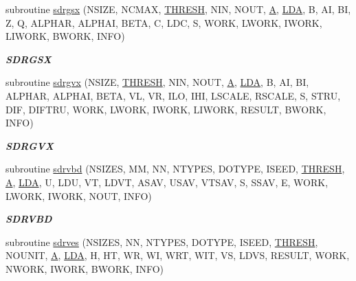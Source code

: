 \begin{DoxyCompactItemize}
subroutine \hyperlink{group__single__eig_gae0b0f905c9537cea1599d61c17e003bc}{sdrgsx} (N\+S\+I\+Z\+E, N\+C\+M\+A\+X, \hyperlink{zlaqgs_8c_a0656018abfc9fa2821827415f5d5ea57}{T\+H\+R\+E\+S\+H}, N\+I\+N, N\+O\+U\+T, \hyperlink{classA}{A}, \hyperlink{example__user_8c_ae946da542ce0db94dced19b2ecefd1aa}{L\+D\+A}, B, A\+I, B\+I, Z, Q, A\+L\+P\+H\+A\+R, A\+L\+P\+H\+A\+I, B\+E\+T\+A, C, L\+D\+C, S, W\+O\+R\+K, L\+W\+O\+R\+K, I\+W\+O\+R\+K, L\+I\+W\+O\+R\+K, B\+W\+O\+R\+K, I\+N\+F\+O)
\begin{DoxyCompactList}\small\item\em {\bfseries S\+D\+R\+G\+S\+X} \end{DoxyCompactList}\item 
subroutine \hyperlink{group__single__eig_ga01b4d3586799e995efa59513c1bc9ec2}{sdrgvx} (N\+S\+I\+Z\+E, \hyperlink{zlaqgs_8c_a0656018abfc9fa2821827415f5d5ea57}{T\+H\+R\+E\+S\+H}, N\+I\+N, N\+O\+U\+T, \hyperlink{classA}{A}, \hyperlink{example__user_8c_ae946da542ce0db94dced19b2ecefd1aa}{L\+D\+A}, B, A\+I, B\+I, A\+L\+P\+H\+A\+R, A\+L\+P\+H\+A\+I, B\+E\+T\+A, V\+L, V\+R, I\+L\+O, I\+H\+I, L\+S\+C\+A\+L\+E, R\+S\+C\+A\+L\+E, S, S\+T\+R\+U, D\+I\+F, D\+I\+F\+T\+R\+U, W\+O\+R\+K, L\+W\+O\+R\+K, I\+W\+O\+R\+K, L\+I\+W\+O\+R\+K, R\+E\+S\+U\+L\+T, B\+W\+O\+R\+K, I\+N\+F\+O)
\begin{DoxyCompactList}\small\item\em {\bfseries S\+D\+R\+G\+V\+X} \end{DoxyCompactList}\item 
subroutine \hyperlink{group__single__eig_ga7a1566f98bf91396ed2fd1e2c70865eb}{sdrvbd} (N\+S\+I\+Z\+E\+S, M\+M, N\+N, N\+T\+Y\+P\+E\+S, D\+O\+T\+Y\+P\+E, I\+S\+E\+E\+D, \hyperlink{zlaqgs_8c_a0656018abfc9fa2821827415f5d5ea57}{T\+H\+R\+E\+S\+H}, \hyperlink{classA}{A}, \hyperlink{example__user_8c_ae946da542ce0db94dced19b2ecefd1aa}{L\+D\+A}, U, L\+D\+U, V\+T, L\+D\+V\+T, A\+S\+A\+V, U\+S\+A\+V, V\+T\+S\+A\+V, S, S\+S\+A\+V, E, W\+O\+R\+K, L\+W\+O\+R\+K, I\+W\+O\+R\+K, N\+O\+U\+T, I\+N\+F\+O)
\begin{DoxyCompactList}\small\item\em {\bfseries S\+D\+R\+V\+B\+D} \end{DoxyCompactList}\item 
subroutine \hyperlink{group__single__eig_ga1f741a939ab68209bb2d6028538da0c1}{sdrves} (N\+S\+I\+Z\+E\+S, N\+N, N\+T\+Y\+P\+E\+S, D\+O\+T\+Y\+P\+E, I\+S\+E\+E\+D, \hyperlink{zlaqgs_8c_a0656018abfc9fa2821827415f5d5ea57}{T\+H\+R\+E\+S\+H}, N\+O\+U\+N\+I\+T, \hyperlink{classA}{A}, \hyperlink{example__user_8c_ae946da542ce0db94dced19b2ecefd1aa}{L\+D\+A}, H, H\+T, W\+R, W\+I, W\+R\+T, W\+I\+T, V\+S, L\+D\+V\+S, R\+E\+S\+U\+L\+T, W\+O\+R\+K, N\+W\+O\+R\+K, I\+W\+O\+R\+K, B\+W\+O\+R\+K, I\+N\+F\+O)

\end{DoxyCompactItemize}

